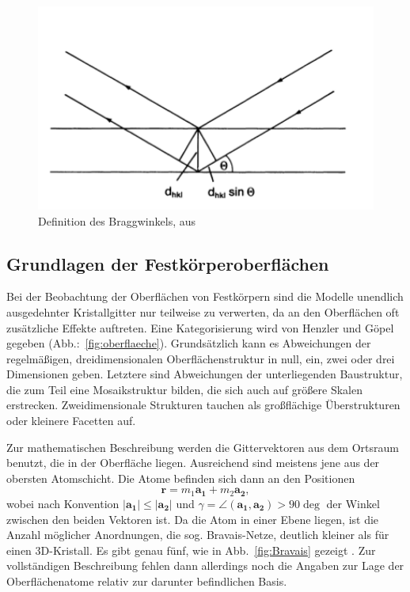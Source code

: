 \begin{figure}
    \includegraphics[width=1.0\textwidth]{pics/Bragg_Winkel}
    \caption{Definition des Braggwinkels,
aus \cite{ibach2009festkorperphysik} }
    \label{fig:Bragg_Winkel}
\end{figure}


\subsection{Grundlagen der Festkörperoberflächen}
Bei der Beobachtung der Oberflächen von Festkörpern sind die Modelle unendlich 
ausgedehnter Kristallgitter nur teilweise zu verwerten, da an den Oberflächen 
oft zusätzliche Effekte auftreten. Eine Kategorisierung wird von Henzler und 
Göpel \cite{henzler1991oberflachenphysik} gegeben (Abb.:~\ref{fig:oberflaeche}).
Grundsätzlich kann es Abweichungen der regelmäßigen, dreidimensionalen 
Oberflächenstruktur in null, ein, zwei oder drei Dimensionen geben. Letztere 
sind Abweichungen der unterliegenden Baustruktur, die zum Teil eine Mosaikstruktur 
bilden, die sich auch auf größere Skalen erstrecken. Zweidimensionale Strukturen 
tauchen als großflächige Überstrukturen oder kleinere Facetten auf. 

Zur mathematischen Beschreibung werden die Gittervektoren aus dem Ortsraum benutzt, 
die in der Oberfläche liegen. Ausreichend sind meistens jene aus der obersten 
Atomschicht. Die Atome befinden sich dann an den Positionen 
\begin{equation}
    \mathbf{r} = m_1 \mathbf{a_1} + m_2 \mathbf{a_2},
\end{equation}
wobei nach Konvention $|\mathbf{a_1}| \le |\mathbf{a_2}|$ und 
$\gamma = \angle (\mathbf{a_1}, \mathbf{a_2}) > 90 \deg$ der Winkel zwischen den 
beiden Vektoren ist. Da die Atom in einer Ebene liegen, ist die Anzahl möglicher 
Anordnungen, die sog. Bravais-Netze, deutlich kleiner als für einen 3D-Kristall. 
Es gibt genau fünf, wie in Abb.~\ref{fig:Bravais} gezeigt 
\cite{henzler1991oberflachenphysik}.
Zur vollständigen Beschreibung fehlen dann allerdings noch die Angaben zur Lage 
der Oberflächenatome relativ zur darunter befindlichen Basis. 

